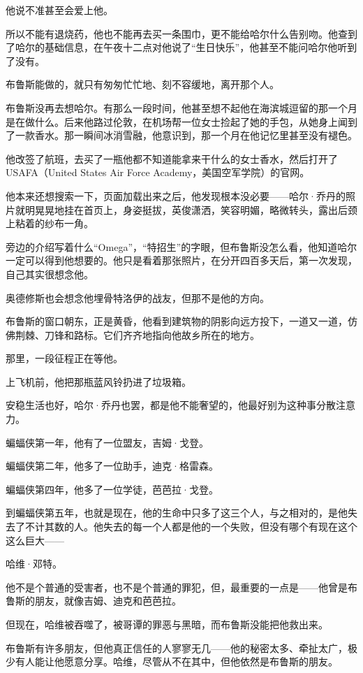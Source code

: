 \documentclass[../main]{subfiles}
\begin{document}
他说不准甚至会爱上他。

所以不能有退烧药，他也不能再去买一条围巾，更不能给哈尔什么告别吻。他查到了哈尔的基础信息，在午夜十二点对他说了“生日快乐”，他甚至不能问哈尔他听到了没有。

布鲁斯能做的，就只有匆匆忙忙地、刻不容缓地，离开那个人。

布鲁斯没再去想哈尔。有那么一段时间，他甚至想不起他在海滨城逗留的那一个月是在做什么。后来他路过伦敦，在机场帮一位女士捡起了她的手包，从她身上闻到了一款香水。那一瞬间冰消雪融，他意识到，那一个月在他记忆里甚至没有褪色。

他改签了航班，去买了一瓶他都不知道能拿来干什么的女士香水，然后打开了USAFA（United
States Air Force Academy，美国空军学院）的官网。

他本来还想搜索一下，页面加载出来之后，他发现根本没必要——哈尔·乔丹的照片就明晃晃地挂在首页上，身姿挺拔，英俊潇洒，笑容明媚，略微转头，露出后颈上粘着的纱布一角。

旁边的介绍写着什么“Omega”，“特招生”的字眼，但布鲁斯没怎么看，他知道哈尔一定可以得到他想要的。他只是看着那张照片，在分开四百多天后，第一次发现，自己其实很想念他。

奥德修斯也会想念他埋骨特洛伊的战友，但那不是他的方向。

布鲁斯的窗口朝东，正是黄昏，他看到建筑物的阴影向远方投下，一道又一道，仿佛荆棘、刀锋和路标。它们齐齐地指向他故乡所在的地方。

那里，一段征程正在等他。

上飞机前，他把那瓶蓝风铃扔进了垃圾箱。

安稳生活也好，哈尔·乔丹也罢，都是他不能奢望的，他最好别为这种事分散注意力。

蝙蝠侠第一年，他有了一位盟友，吉姆·戈登。

蝙蝠侠第二年，他多了一位助手，迪克·格雷森。

蝙蝠侠第四年，他多了一位学徒，芭芭拉·戈登。

到蝙蝠侠第五年，也就是现在，他的生命中只多了这三个人，与之相对的，是他失去了不计其数的人。他失去的每一个人都是他的一个失败，但没有哪个有现在这个这么巨大——

哈维·邓特。

他不是个普通的受害者，也不是个普通的罪犯，但，最重要的一点是——他曾是布鲁斯的朋友，就像吉姆、迪克和芭芭拉。

但现在，哈维被吞噬了，被哥谭的罪恶与黑暗，而布鲁斯没能把他救出来。

布鲁斯有许多朋友，但他真正信任的人寥寥无几——他的秘密太多、牵扯太广，极少有人能让他愿意分享。哈维，尽管从不在其中，但他依然是布鲁斯的朋友。
\end{document}
